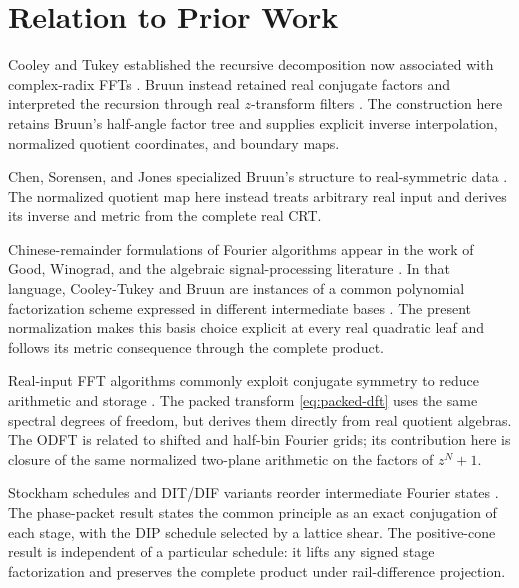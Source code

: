 \section{Relation to Prior Work}
\label{sec:related}

Cooley and Tukey established the recursive decomposition now associated with
complex-radix FFTs \cite{cooley1965}.  Bruun instead retained real conjugate
factors and interpreted the recursion through real $z$-transform filters
\cite{bruun1978}.  The construction here retains Bruun's half-angle factor tree
and supplies explicit inverse interpolation, normalized quotient coordinates,
and boundary maps.

Chen, Sorensen, and Jones specialized Bruun's structure to real-symmetric data
\cite{chen1992}.  The normalized quotient map here instead treats arbitrary
real input and derives its inverse and metric from the complete real CRT.

Chinese-remainder formulations of Fourier algorithms appear in the work of
Good, Winograd, and the algebraic signal-processing literature
\cite{good1958,winograd1978,puschel2008,voronenko2009}.  In that language,
Cooley-Tukey and Bruun are instances of a common polynomial factorization
scheme expressed in different intermediate bases \cite{voronenko2009}.  The
present normalization makes this basis choice explicit at every real quadratic
leaf and follows its metric consequence through the complete product.

Real-input FFT algorithms commonly exploit conjugate symmetry to reduce
arithmetic and storage \cite{sorensen1987,duhamel1990}.  The packed transform
\eqref{eq:packed-dft} uses the same spectral degrees of freedom, but derives
them directly from real quotient algebras.  The ODFT is related to shifted and
half-bin Fourier grids; its contribution here is closure of the same normalized
two-plane arithmetic on the factors of $z^N+1$.

Stockham schedules and DIT/DIF variants reorder intermediate Fourier states
\cite{stockham1966,duhamel1990}.  The phase-packet result states the common
principle as an exact conjugation of each stage, with the DIP schedule selected
by a lattice shear.  The positive-cone result is independent of a particular
schedule: it lifts any signed stage factorization and preserves the complete
product under rail-difference projection.

